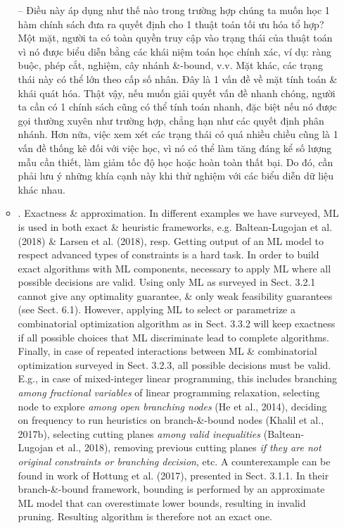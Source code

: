 \documentclass{article}
\begin{document}
\begin{itemize}
\begin{itemize}
        -- Điều này áp dụng như thế nào trong trường hợp chúng ta muốn học 1 hàm chính sách đưa ra quyết định cho 1 thuật toán tối ưu hóa tổ hợp? Một mặt, người ta có toàn quyền truy cập vào trạng thái của thuật toán vì nó được biểu diễn bằng các khái niệm toán học chính xác, ví dụ: ràng buộc, phép cắt, nghiệm, cây nhánh \&-bound, v.v. Mặt khác, các trạng thái này có thể lớn theo cấp số nhân. Đây là 1 vấn đề về mặt tính toán \& khái quát hóa. Thật vậy, nếu muốn giải quyết vấn đề nhanh chóng, người ta cần có 1 chính sách cũng có thể tính toán nhanh, đặc biệt nếu nó được gọi thường xuyên như trường hợp, chẳng hạn như các quyết định phân nhánh. Hơn nữa, việc xem xét các trạng thái có quá nhiều chiều cũng là 1 vấn đề thống kê đối với việc học, vì nó có thể làm tăng đáng kể số lượng mẫu cần thiết, làm giảm tốc độ học hoặc hoàn toàn thất bại. Do đó, cần phải lưu ý những khía cạnh này khi thử nghiệm với các biểu diễn dữ liệu khác nhau.
        \item {. Exactness \& approximation.} In different examples we have surveyed, ML is used in both exact \& heuristic frameworks, e.g. Baltean-Lugojan et al. (2018) \& Larsen et al. (2018), resp. Getting output of an ML model to respect advanced types of constraints is a hard task. In order to build exact algorithms with ML components, necessary to apply ML where all possible decisions are valid. Using only ML as surveyed in Sect. 3.2.1 cannot give any optimality guarantee, \& only weak feasibility guarantees (see Sect. 6.1). However, applying ML to select or parametrize a combinatorial optimization algorithm as in Sect. 3.3.2 will keep exactness if all possible choices that ML discriminate lead to complete algorithms. Finally, in case of repeated interactions between ML \& combinatorial optimization surveyed in Sect. 3.2.3, all possible decisions must be valid. E.g., in case of mixed-integer linear programming, this includes branching {\it among fractional variables} of linear programming relaxation, selecting node to explore {\it among open branching nodes} (He et al., 2014), deciding on frequency to run heuristics on branch-\&-bound nodes (Khalil et al., 2017b), selecting cutting planes {\it among valid inequalities} (Baltean-Lugojan et al., 2018), removing previous cutting planes {\it if they are not original constraints or branching decision}, etc. A counterexample can be found in work of Hottung et al. (2017), presented in Sect. 3.1.1. In their branch-\&-bound framework, bounding is performed by an approximate ML model that can overestimate lower bounds, resulting in invalid pruning. Resulting algorithm is therefore not an exact one.


\end{itemize}
\end{itemize}
\end{document}
